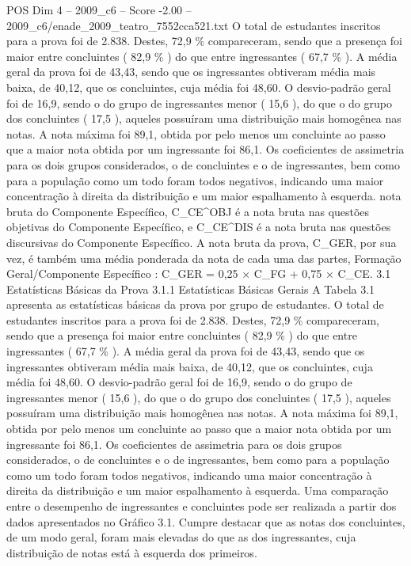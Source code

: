 \begin{textsample}{POS Dim 4 – 2009\_c6 – Score -2.00 – 2009\_c6/enade\_2009\_teatro\_7552cca521.txt}
O total de estudantes inscritos para a prova foi de 2.838.
Destes, 72,9 \% compareceram, sendo que a presença foi maior entre concluintes ( 82,9 \% ) do que entre ingressantes ( 67,7 \% ).
A média geral da prova foi de 43,43, sendo que os ingressantes obtiveram média mais baixa, de 40,12, que os concluintes, cuja média foi 48,60.
O desvio-padrão geral foi de 16,9, sendo o do grupo de ingressantes menor ( 15,6 ), do que o do grupo dos concluintes ( 17,5 ), aqueles possuíram uma distribuição mais homogênea nas notas.
A nota máxima foi 89,1, obtida por pelo menos um concluinte ao passo que a maior nota obtida por um ingressante foi 86,1.
Os coeficientes de assimetria para os dois grupos considerados, o de concluintes e o de ingressantes, bem como para a população como um todo foram todos negativos, indicando uma maior concentração à direita da distribuição e um maior espalhamento à esquerda. nota bruta do Componente Específico, C\_CE\textasciicircum{}OBJ é a nota bruta nas questões objetivas do Componente Específico, e C\_CE\textasciicircum{}DIS é a nota bruta nas questões discursivas do Componente Específico.
A nota bruta da prova, C\_GER, por sua vez, é também uma média ponderada da nota de cada uma das partes, Formação Geral/Componente Específico : C\_GER = 0,25 × C\_FG + 0,75 × C\_CE. 3.1 Estatísticas Básicas da Prova 3.1.1 Estatísticas Básicas Gerais A Tabela 3.1 apresenta as estatísticas básicas da prova por grupo de estudantes.
O total de estudantes inscritos para a prova foi de 2.838.
Destes, 72,9 \% compareceram, sendo que a presença foi maior entre concluintes ( 82,9 \% ) do que entre ingressantes ( 67,7 \% ).
A média geral da prova foi de 43,43, sendo que os ingressantes obtiveram média mais baixa, de 40,12, que os concluintes, cuja média foi 48,60.
O desvio-padrão geral foi de 16,9, sendo o do grupo de ingressantes menor ( 15,6 ), do que o do grupo dos concluintes ( 17,5 ), aqueles possuíram uma distribuição mais homogênea nas notas.
A nota máxima foi 89,1, obtida por pelo menos um concluinte ao passo que a maior nota obtida por um ingressante foi 86,1.
Os coeficientes de assimetria para os dois grupos considerados, o de concluintes e o de ingressantes, bem como para a população como um todo foram todos negativos, indicando uma maior concentração à direita da distribuição e um maior espalhamento à esquerda.
Uma comparação entre o desempenho de ingressantes e concluintes pode ser realizada a partir dos dados apresentados no Gráfico 3.1.
Cumpre destacar que as notas dos concluintes, de um modo geral, foram mais elevadas do que as dos ingressantes, cuja distribuição de notas está à esquerda dos primeiros.

\end{textsample}
